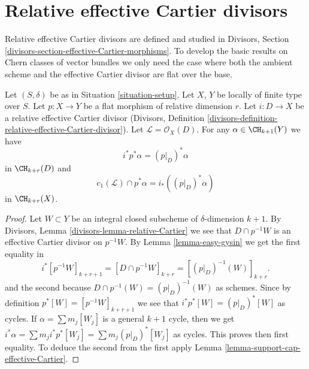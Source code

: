 \section{Relative effective Cartier divisors}
\label{section-relative-effective-cartier}

\noindent
Relative effective Cartier divisors are defined and studied
in Divisors, Section \ref{divisors-section-effective-Cartier-morphisms}.
To develop the basic results on Chern classes of vector bundles
we only need the case where both the ambient scheme and the effective
Cartier divisor are flat over the base.

\begin{lemma}
\label{lemma-relative-effective-cartier}
Let $(S, \delta)$ be as in Situation \ref{situation-setup}.
Let $X$, $Y$ be locally of finite type over $S$.
Let $p : X \to Y$ be a flat morphism of relative dimension $r$.
Let $i : D \to X$ be a relative effective Cartier divisor
(Divisors, Definition
\ref{divisors-definition-relative-effective-Cartier-divisor}).
Let $\mathcal{L} = \mathcal{O}_X(D)$.
For any $\alpha \in \CH_{k + 1}(Y)$ we have
$$
i^*p^*\alpha = (p|_D)^*\alpha
$$
in $\CH_{k + r}(D)$ and
$$
c_1(\mathcal{L}) \cap p^*\alpha = i_* ((p|_D)^*\alpha)
$$
in $\CH_{k + r}(X)$.
\end{lemma}

\begin{proof}
Let $W \subset Y$ be an integral closed subscheme of $\delta$-dimension
$k + 1$. By Divisors, Lemma \ref{divisors-lemma-relative-Cartier}
we see that $D \cap p^{-1}W$ is an effective
Cartier divisor on $p^{-1}W$. By Lemma \ref{lemma-easy-gysin}
we get the first equality in
$$
i^*[p^{-1}W]_{k + r + 1} =
[D \cap p^{-1}W]_{k + r} =
[(p|_D)^{-1}(W)]_{k + r}.
$$
and the second because $D \cap p^{-1}(W) = (p|_D)^{-1}(W)$ as schemes.
Since by definition $p^*[W] = [p^{-1}W]_{k + r + 1}$ we see that
$i^*p^*[W] = (p|_D)^*[W]$ as cycles. If $\alpha = \sum m_j[W_j]$ is a
general $k + 1$ cycle, then we get
$i^*\alpha = \sum m_j i^*p^*[W_j] = \sum m_j(p|_D)^*[W_j]$ as cycles.
This proves then first equality. To deduce the second from the
first apply Lemma \ref{lemma-support-cap-effective-Cartier}.
\end{proof}









